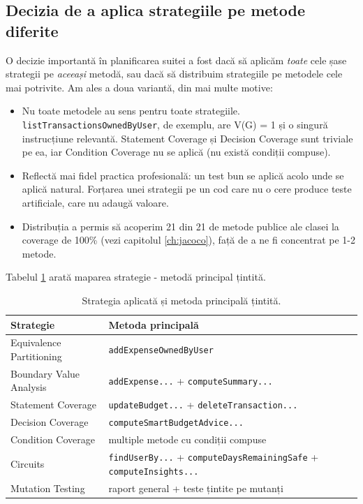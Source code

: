 \subsection{Decizia de a aplica strategiile pe metode diferite}

O decizie importantă în planificarea suitei a fost dacă să aplicăm \textit{toate} cele șase strategii pe \textit{aceeași} metodă, sau dacă să distribuim strategiile pe metodele cele mai potrivite. Am ales a doua variantă, din mai multe motive:

\begin{itemize}
    \item Nu toate metodele au sens pentru toate strategiile. \texttt{listTransactionsOwnedByUser}, de exemplu, are V(G) = 1 și o singură instrucțiune relevantă. Statement Coverage și Decision Coverage sunt triviale pe ea, iar Condition Coverage nu se aplică (nu există condiții compuse).
    \item Reflectă mai fidel practica profesională: un test bun se aplică acolo unde se aplică natural. Forțarea unei strategii pe un cod care nu o cere produce teste artificiale, care nu adaugă valoare.
    \item Distribuția a permis să acoperim 21 din 21 de metode publice ale clasei la coverage de 100\% (vezi capitolul \ref{ch:jacoco}), față de a ne fi concentrat pe 1-2 metode.
\end{itemize}

Tabelul \ref{tab:strategy-method} arată maparea strategie - metodă principal țintită.

\begin{table}[!htb]
\centering
\caption{Strategia aplicată și metoda principală țintită.}
\label{tab:strategy-method}
\begin{tabularx}{\linewidth}{lX}
\toprule
\textbf{Strategie} & \textbf{Metoda principală} \\
\midrule
Equivalence Partitioning & \texttt{addExpenseOwnedByUser} \\
Boundary Value Analysis & \texttt{addExpense...} + \texttt{computeSummary...} \\
Statement Coverage & \texttt{updateBudget...} + \texttt{deleteTransaction...} \\
Decision Coverage & \texttt{computeSmartBudgetAdvice...} \\
Condition Coverage & multiple metode cu condiții compuse \\
Circuits & \texttt{findUserBy...} + \texttt{computeDaysRemainingSafe} + \texttt{computeInsights...} \\
Mutation Testing & raport general + teste țintite pe mutanți \\
\bottomrule
\end{tabularx}
\end{table}

